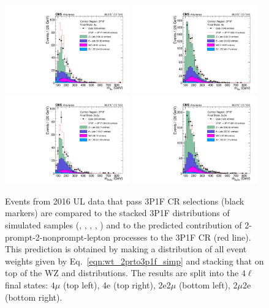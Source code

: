 \begin{figure}[!htbp]
	\begin{center}
		\includegraphics[width=0.48\textwidth]{figures/higgsmassmeas/redbkg/cr/UL2016_CR_3P1F_4mu.pdf}
		\includegraphics[width=0.48\textwidth]{figures/higgsmassmeas/redbkg/cr/UL2016_CR_3P1F_4e.pdf}
		\includegraphics[width=0.48\textwidth]{figures/higgsmassmeas/redbkg/cr/UL2016_CR_3P1F_2e2mu.pdf}
		\includegraphics[width=0.48\textwidth]{figures/higgsmassmeas/redbkg/cr/UL2016_CR_3P1F_2mu2e.pdf}
		\caption{
			Events from 2016 UL data that pass 3P1F CR selections (black markers) 
			are compared to the stacked 3P1F distributions of simulated samples
			(\Zplusjets, \ttbarplusjets, \WZ, \Zgammastar, \ZZ)
			and to the predicted contribution of 2-prompt-2-nonprompt-lepton processes to the 3P1F CR (red line).
			This prediction is obtained by making a distribution of all event weights given by Eq.~\ref{eqn:wt_2prto3p1f_simp} and stacking that on top of the WZ and \ZZ distributions.
			The results are split into the $4\ell$ final states:
			$4\mu$ (top left), 4e (top right), 2e2$\mu$ (bottom left), 2$\mu$2e (bottom right).
		}
		\label{cr_plots_3p1f_2016}
	\end{center}
\end{figure}
